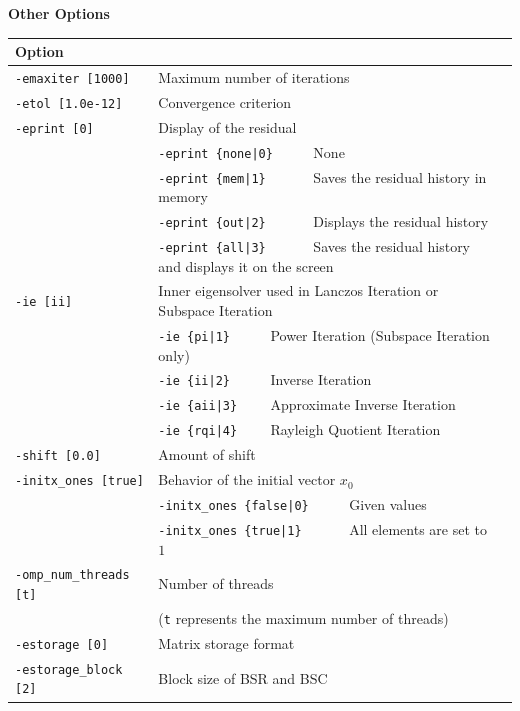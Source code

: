 \documentclass[a4paper]{article}
\begin{document}
\begin{minipage}[t]{\textwidth}
\begin{center}
{\bf Other Options}\\
\begin{tabular}{l|ll}\hline\hline
Option &                          \\ \hline
\verb=-emaxiter [1000]= & Maximum number of iterations         \\ 
\verb=-etol [1.0e-12]=  & Convergence criterion              \\
\verb=-eprint [0]=      & Display of the residual                 \\
                       & \verb=-eprint {none|0}     =  None \\
                       & \verb=-eprint {mem|1}      =  Saves the residual history in memory\\
                       & \verb=-eprint {out|2}      =  Displays the residual history\\
                       & \verb=-eprint {all|3}      =  Saves the residual history and displays it on the screen\\
\verb=-ie [ii]= & Inner eigensolver used in Lanczos Iteration or Subspace
 Iteration\\
                       & \verb=-ie {pi|1}     =  Power Iteration (Subspace Iteration only)\\
                       & \verb=-ie {ii|2}     =  Inverse Iteration \\
                       & \verb=-ie {aii|3}    =  Approximate Inverse Iteration \\
                       & \verb=-ie {rqi|4}    =  Rayleigh Quotient Iteration \\
\verb=-shift [0.0]= & Amount of shift  \\
\verb=-initx_ones [true]= & Behavior of the initial vector $x_{0}$  \\
                       & \verb=-initx_ones {false|0}     =  Given values \\
                       & \verb=-initx_ones {true|1}      =  All elements are set to $1$ \\
\verb=-omp_num_threads [t]= & Number of threads        \\ 
                            & (\verb=t= represents the maximum number of threads) \\
\verb=-estorage [0]=   & Matrix storage format \\
\verb=-estorage_block [2]=& Block size of BSR and BSC\\ 
\hline         
\end{tabular}
\end{center}
\end{minipage}
\end{document}
